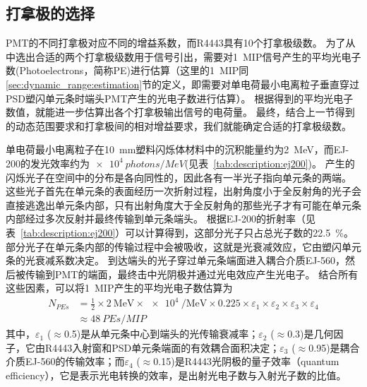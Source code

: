 \subsection{打拿极的选择}
\label{sec:dynamic_range:dynode_selection}
PMT的不同打拿极对应不同的增益系数，而R4443具有10个打拿极级数。
为了从中选出合适的两个打拿极级数用于信号引出，需要对\SI{1}{MIP}信号产生的平均光电子数(Photoelectrons，简称PE)进行估算（这里的\SI{1}{MIP}同\ref{sec:dynamic_range:estimation}节的定义，即需要对单电荷最小电离粒子垂直穿过PSD塑闪单元条时端头PMT产生的光电子数进行估算）。
根据得到的平均光电子数值，就能进一步估算出各个打拿极输出信号的电荷量。
最终，结合上一节得到的动态范围要求和打拿极间的相对增益要求，我们就能确定合适的打拿极级数。

单电荷最小电离粒子在\SI{10}{mm}塑料闪烁体材料中的沉积能量约为\SI{2}{MeV}，而EJ-200的发光效率约为$\SI{e4}{photons/MeV}$(见表~\ref{tab:description:ej200})。
产生的闪烁光子在空间中的分布是各向同性的，因此各有一半光子指向单元条的两端。
这些光子首先在单元条的表面经历一次折射过程，出射角度小于全反射角的光子会直接逃逸出单元条内部，只有出射角度大于全反射角的那些光子才有可能在单元条内部经过多次反射并最终传输到单元条端头。
根据EJ-200的折射率（见表~\ref{tab:description:ej200}）可以计算得到，这部分光子只占总光子数的\SI{22.5}{\percent}。
部分光子在单元条内部的传输过程中会被吸收，这就是光衰减效应，它由塑闪单元条的光衰减系数决定。
到达端头的光子穿过单元条端面进入耦合介质EJ-560，然后被传输到PMT的端面，最终击中光阴极并通过光电效应产生光电子。
结合所有这些因素，可以将\SI{1}{MIP}产生的平均光电子数估算为
\begin{align}
 N_{PEs} &= \frac{1}{2} \times \SI[per-mode=symbol]{2}{\mega\electronvolt} \times \SI{e4}{\per\mega\electronvolt} \times 0.225
           \times \varepsilon_{1} \times \varepsilon_{2} \times \varepsilon_{3} \times \varepsilon_{4} \nonumber \\
         &\approx \SI{48}{PEs\per{MIP}}
\label{eq:dynamic_range:pe_estimation}
\end{align}
其中，$\varepsilon_1$ ($\approx$0.5)是从单元条中心到端头的光传输衰减率；$\varepsilon_2$ ($\approx$0.3)是几何因子，它由R4443入射窗和PSD单元条端面的有效耦合面积决定；$\varepsilon_3$ ($\approx$0.95)是耦合介质EJ-560的传输效率；而$\varepsilon_4$ ($\approx$0.15)是R4443光阴极的量子效率（quantum efficiency），它是表示光电转换的效率，是出射光电子数与入射光子数的比值。

